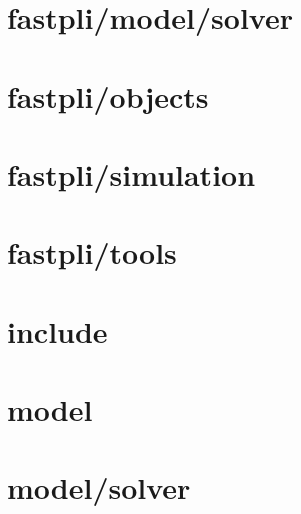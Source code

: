 \section{fastpli/model/solver}


\section{fastpli/objects}




\section{fastpli/simulation}



\section{fastpli/tools}



\section{include}
\section{model}
\section{model/solver}





